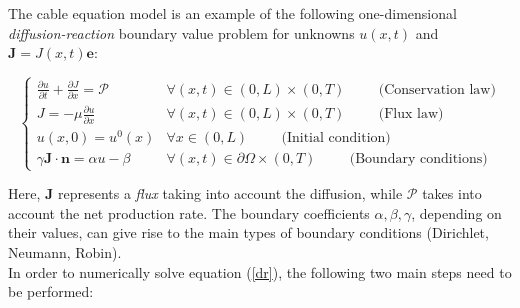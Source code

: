 \documentclass[12pt, a4paper]{article}
\begin{document}
The cable equation model is an example of the following one-dimensional \textit{diffusion-reaction} boundary value problem for unknowns $ u(x,t)$ and $\textbf{J} = J(x,t)\textbf{e}$:


\begin{equation}
\begin{cases}
\frac{\partial u}{\partial t} +\frac{\partial J}{\partial x} = \mathcal{P} & \forall (x,t) \in (0,L) \times (0,T) \hspace{1cm} \text{(Conservation law)} \\
J = - \mu \frac{\partial u}{\partial x} & \forall (x,t) \in (0,L) \times (0,T) \hspace{1cm} \text{(Flux law)}\\
u(x,0) = u^0(x) & \forall x \in (0,L) \hspace{1cm}  \text{(Initial condition)} \\
\gamma \textbf{J} \cdot \textbf{n} = \alpha u - \beta &  \forall (x,t) \in \partial \Omega \times (0,T) \hspace{1cm} \text{(Boundary conditions)}
\end{cases} \label{dr}
\end{equation}

Here, $\textbf{J}$  represents a \textit{flux} taking into account the diffusion, while $\mathcal{P}$ takes into account the  net production rate. The boundary coefficients $\alpha, \beta, \gamma$, depending on their values, can give rise to the main types of boundary conditions (Dirichlet, Neumann, Robin).\\
In order to numerically solve equation (\ref{dr}), the following two main steps need to be performed:
\end{document}
